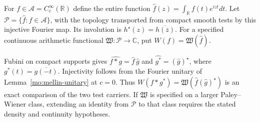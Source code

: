 \begin{definition}
\label{v4-arith:mc:test-algebra}
For $f\in\mathscr A=C_c^\infty(\mathbb R)$ define the entire function
$\widehat f(z)=\int_{\mathbb R}f(t)e^{izt}dt$.
Let $\mathscr P=\{\widehat f:f\in\mathscr A\}$, with the topology
transported from compact smooth tests by this injective Fourier map.
Its involution is $h^\star(z)=\overline{h(\overline z)}$.
For a specified continuous arithmetic functional
$\mathfrak W:\mathscr P\to\mathbb C$, put
$W(f)=\mathfrak W(\widehat f)$.
\end{definition}

Fubini on compact supports gives
$\widehat{f*g}=\widehat f\,\widehat g$ and
$\widehat{g^*}=(\widehat g)^\star$, where
$g^*(t)=\overline{g(-t)}$.
Injectivity follows from the Fourier unitary of
Lemma~\ref{mo:mellin-unitary} at $c=0$.
Thus $W(f*g^*)=\mathfrak W(\widehat f(\widehat g)^\star)$
is an exact comparison of the two test carriers.
If $\mathfrak W$ is specified on a larger Paley--Wiener class,
extending an identity from $\mathscr P$ to that class requires
the stated density and continuity hypotheses.


